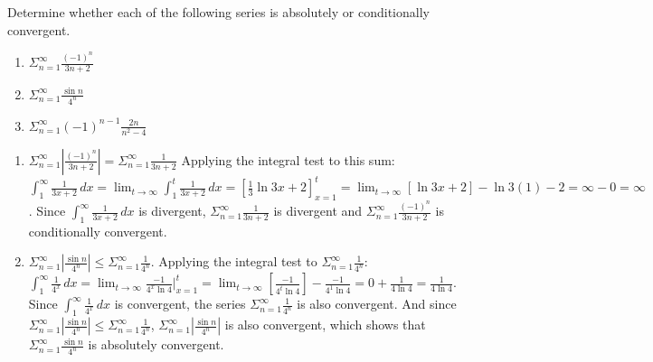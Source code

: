 \begin{Exercise}[label = absconv2]
Determine whether each of the following series is absolutely or conditionally 
convergent. 
\begin{enumerate}
\item $\Sigma_{n=1}^\infty \frac{(-1)^n}{3n + 2}$
\item $\Sigma_{n=1}^\infty \frac{\sin{n}}{4^n}$
\item $\Sigma_{n=1}^\infty (-1)^{n-1} \frac{2n}{n^2-4}$ 
\end{enumerate}
\vspace{50mm}
\end{Exercise}

\begin{Answer}[ref = absconv2]
\begin{enumerate}
\item $\Sigma_{n=1}^\infty \left| \frac{(-1)^n}{3n+2} \right| = \Sigma_{n=1}^
\infty \frac{1}{3n + 2}$ Applying the integral test to this sum: $\int_1^
\infty \frac{1}{3x+2}\,dx = \lim_{t \to \infty} \int_1^t \frac{1}{3x+2}\,dx = 
\left[ \frac{1}{3} \ln{3x + 2} \right]_{x=1}^t = \lim_{t \to \infty} \left[ 
\ln{3x + 2} \right] - \ln{3(1) - 2} = \infty - 0 = \infty$. Since $\int_1^\infty 
\frac{1}{3x + 2}\,dx$ is divergent, $\Sigma_{n=1}^\infty \frac{1}{3n + 2}$ is 
divergent and $\Sigma_{n=1}^\infty \frac{(-1)^n}{3n + 2}$ is conditionally 
convergent.
\item $\Sigma_{n=1}^\infty \left| \frac{\sin{n}}{4^n} \right| \leq \Sigma_{n=1}
^\infty \frac{1}{4^n}$. Applying the integral test to $\Sigma_{n=1}^\infty 
\frac{1}{4^n}$: $\int_1^\infty \frac{1}{4^x}\,dx = \lim_{t \to \infty} 
\frac{-1}{4^x \ln{4}}|_{x=1}^t = \lim_{t \to \infty} \left[ \frac{-1}{4^t 
\ln{4}} \right] - \frac{-1}{4^1 \ln{4}} = 0 + \frac{1}{4 \ln{4}} = \frac{1}{4 
\ln{4}}$. Since $\int_1^\infty \frac{1}{4^x}\,dx$ is convergent, the series 
$\Sigma_{n=1}^\infty \frac{1}{4^n}$ is also convergent. And since $\Sigma_{n=1}
^\infty \left| \frac{\sin{n}}{4^n} \right| \leq \Sigma_{n=1}^\infty 
\frac{1}{4^n}$, $\Sigma_{n=1}^\infty \left| \frac{\sin{n}}{4^n} \right|$ is 
also convergent, which shows that $\Sigma_{n=1}^\infty \frac{\sin{n}}{4^n}$ is 
absolutely convergent. 
\end{enumerate}
\end{Answer}

